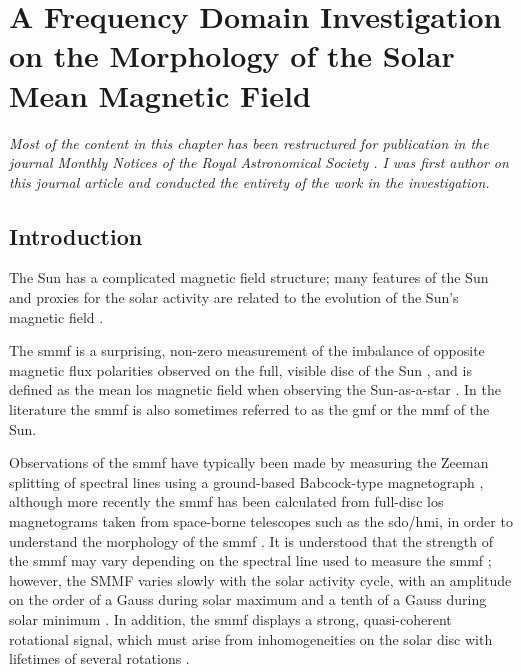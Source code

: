 \chapter{A Frequency Domain Investigation on the Morphology of the Solar Mean Magnetic Field}\label{chap:SMMF}


\textit{Most of the content in this chapter has been restructured for publication in the journal Monthly Notices of the Royal Astronomical Society \citep{ross_lifetimes_2021}. I was first author on this journal article and conducted the entirety of the work in the investigation.}

\section{Introduction}\label{sec:SMMF_intro}

The Sun has a complicated magnetic field structure; many features of the Sun and proxies for the solar activity are related to the evolution of the Sun's magnetic field \citep{wu_solar_2018}.

The \gls{smmf} is a surprising, non-zero measurement of the imbalance of opposite magnetic flux polarities observed on the full, visible disc of the Sun \citep{svalgaard_suns_1975}, and is defined as the mean \gls{los} magnetic field when observing the Sun-as-a-star \citep{scherrer_mean_1977, scherrer_mean_1977-1, garcia_integrated_1999}. In the literature the \gls{smmf} is also sometimes referred to as the \gls{gmf} \citep{severny_time_1971} or the \gls{mmf} \citep{kotov_mean_2008} of the Sun.

Observations of the \gls{smmf} have typically been made by measuring the Zeeman splitting of spectral lines using a ground-based Babcock-type magnetograph \citep{scherrer_mean_1977}, although more recently the \gls{smmf} has been calculated from full-disc \gls{los} magnetograms taken from space-borne telescopes such as the \gls{sdo/hmi}, in order to understand the morphology of the \gls{smmf} \citep{kutsenko_contribution_2017, bose_variability_2018}. It is understood that the strength of the \gls{smmf} may vary depending on the spectral line used to measure the \gls{smmf} \citep{kotov_mean_2008, kotov_enigmas_2012}; however, the SMMF varies slowly with the solar activity cycle, with an amplitude on the order of a Gauss during solar maximum and a tenth of a Gauss during solar minimum \citep{plachinda_general_2011}. In addition, the \gls{smmf} displays a strong, quasi-coherent rotational signal, which must arise from inhomogeneities on the solar disc with lifetimes of several rotations \citep{chaplin_studies_2003, xie_temporal_2017}.

